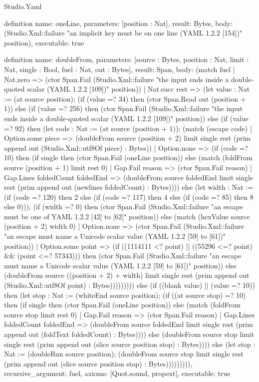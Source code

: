 \begin{lexlean}{Studio.Yaml}
\begin{semanticmodule}
definition{
  name: oneLine,
  parameters: [position : Nat],
  result: Bytes,
  body: (Studio.Xml::failure "an implicit key must be on one line (YAML 1.2.2 [154])" position),
  executable: true
}

definition{
  name: doubleFrom,
  parameters: [source : Bytes, position : Nat, limit : Nat, single : Bool, fuel : Nat, out : Bytes],
  result: Span,
  body: (match fuel
    | Nat.zero => (ctor Span.Fail (Studio.Xml::failure "the input ends inside a double-quoted scalar (YAML 1.2.2 [109])" position))
    | Nat.succ rest => (let value : Nat := (at source position); (if (value =? 34) then (ctor Span.Read out (position + 1)) else (if (value =? 256) then (ctor Span.Fail (Studio.Xml::failure "the input ends inside a double-quoted scalar (YAML 1.2.2 [109])" position)) else (if (value =? 92) then (let code : Nat := (at source (position + 1)); (match (escape code)
      | Option.some piece => (doubleFrom source (position + 2) limit single rest (prim append out (Studio.Xml::utf8Of piece) : Bytes))
      | Option.none => (if (code =? 10) then (if single then (ctor Span.Fail (oneLine position)) else (match (foldFrom source (position + 1) limit rest 0)
        | Gap.Fail reason => (ctor Span.Fail reason)
        | Gap.Lines foldedCount foldedEnd => (doubleFrom source foldedEnd limit single rest (prim append out (newlines foldedCount) : Bytes)))) else (let width : Nat := (if (code =? 120) then 2 else (if (code =? 117) then 4 else (if (code =? 85) then 8 else 0))); (if (width =? 0) then (ctor Span.Fail (Studio.Xml::failure "an escape must be one of YAML 1.2.2 [42] to [62]" position)) else (match (hexValue source (position + 2) width 0)
        | Option.none => (ctor Span.Fail (Studio.Xml::failure "an escape must name a Unicode scalar value (YAML 1.2.2 [59] to [61])" position))
        | Option.some point => (if ((1114111 <? point) || ((55296 <=? point) && (point <=? 57343))) then (ctor Span.Fail (Studio.Xml::failure "an escape must name a Unicode scalar value (YAML 1.2.2 [59] to [61])" position)) else (doubleFrom source ((position + 2) + width) limit single rest (prim append out (Studio.Xml::utf8Of point) : Bytes))))))))) else (if ((blank value) || (value =? 10)) then (let stop : Nat := (whiteEnd source position); (if ((at source stop) =? 10) then (if single then (ctor Span.Fail (oneLine position)) else (match (foldFrom source stop limit rest 0)
      | Gap.Fail reason => (ctor Span.Fail reason)
      | Gap.Lines foldedCount foldedEnd => (doubleFrom source foldedEnd limit single rest (prim append out (foldText foldedCount) : Bytes)))) else (doubleFrom source stop limit single rest (prim append out (slice source position stop) : Bytes)))) else (let stop : Nat := (doubleRun source position); (doubleFrom source stop limit single rest (prim append out (slice source position stop) : Bytes))))))))),
  recursive_argument: fuel,
  axioms: [Quot.sound, propext],
  executable: true
}


\end{semanticmodule}
\end{lexlean}

